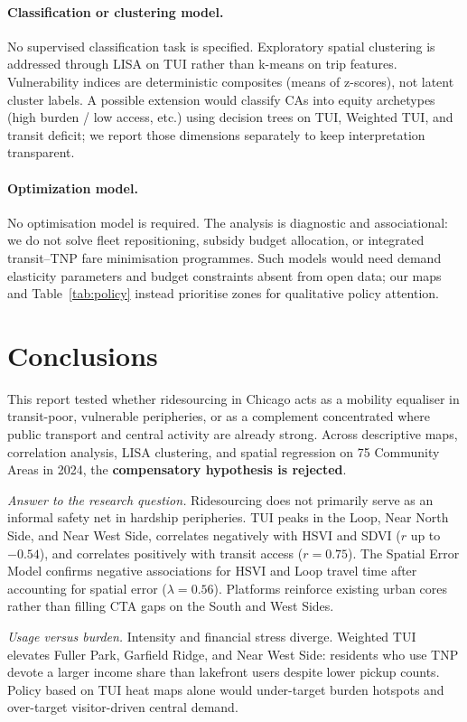 \documentclass[10pt, a4paper]{article}
\begin{document}
\paragraph{Classification or clustering model.}
No supervised classification task is specified. Exploratory spatial clustering is addressed through LISA on TUI rather than k-means on trip features. Vulnerability indices are deterministic composites (means of z-scores), not latent cluster labels. A possible extension would classify CAs into equity archetypes (high burden / low access, etc.) using decision trees on TUI, Weighted TUI, and transit deficit; we report those dimensions separately to keep interpretation transparent.

\paragraph{Optimization model.}
No optimisation model is required. The analysis is diagnostic and associational: we do not solve fleet repositioning, subsidy budget allocation, or integrated transit--TNP fare minimisation programmes. Such models would need demand elasticity parameters and budget constraints absent from open data; our maps and Table~\ref{tab:policy} instead prioritise zones for qualitative policy attention.

\newpage
\section{Conclusions}
This report tested whether ridesourcing in Chicago acts as a mobility equaliser in transit-poor, vulnerable peripheries, or as a complement concentrated where public transport and central activity are already strong. Across descriptive maps, correlation analysis, LISA clustering, and spatial regression on 75 Community Areas in 2024, the \textbf{compensatory hypothesis is rejected}.

\textit{Answer to the research question.} Ridesourcing does not primarily serve as an informal safety net in hardship peripheries. TUI peaks in the Loop, Near North Side, and Near West Side, correlates negatively with HSVI and SDVI ($r$ up to $-0.54$), and correlates positively with transit access ($r=0.75$). The Spatial Error Model confirms negative associations for HSVI and Loop travel time after accounting for spatial error ($\lambda=0.56$). Platforms reinforce existing urban cores rather than filling CTA gaps on the South and West Sides.

\textit{Usage versus burden.} Intensity and financial stress diverge. Weighted TUI elevates Fuller Park, Garfield Ridge, and Near West Side: residents who use TNP devote a larger income share than lakefront users despite lower pickup counts. Policy based on TUI heat maps alone would under-target burden hotspots and over-target visitor-driven central demand.
\end{document}
